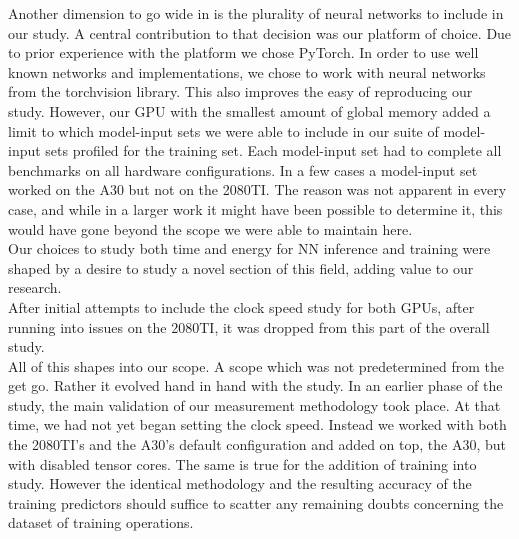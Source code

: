 Another dimension to go wide in is the plurality of neural networks to include in our study. A central contribution to that decision was our platform of choice. Due to prior experience with the platform we chose PyTorch. In order to use well known networks and implementations, we chose to work with neural networks from the torchvision library. This also improves the easy of reproducing our study. However, our GPU with the smallest amount of global memory added a limit to which model-input sets we were able to include in our suite of model-input sets profiled for the training set. Each model-input set had to complete all benchmarks on all hardware configurations. In a few cases a model-input set worked on the A30 but not on the 2080TI. The reason was not apparent in every case, and while in a larger work it might have been possible to determine it, this would have gone beyond the scope we were able to maintain here. \\
Our choices to study both time and energy for NN inference and training were shaped by a desire to study a novel section of this field, adding value to our research.  \\
After initial attempts to include the clock speed study for both GPUs, after running into issues on the 2080TI, it was dropped from this part of the overall study.\\
All of this shapes into our scope. A scope which was not predetermined from the get go. Rather it evolved hand in hand with the study. In an earlier phase of the study, the main validation of our measurement methodology took place. At that time, we had not yet began setting the clock speed. Instead we worked with both the 2080TI's and the A30's default configuration and added on top, the A30, but with disabled tensor cores. The same is true for the addition of training into study. However the identical methodology and the resulting accuracy of the training predictors should suffice to scatter any remaining doubts concerning the dataset of training operations.\\
